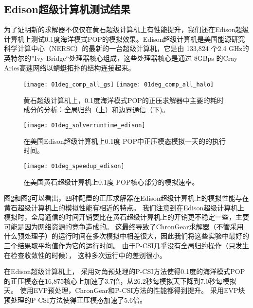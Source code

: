  

\subsection{Edison超级计算机测试结果}
\label{precond:exp:Edison}

 
为了证明新的求解器不仅仅在黄石超级计算机上有性能提升，我们还在Edison超级计算机上测试0.1度海洋模式POP的模拟效果。Edison超级计算机是美国能源研究科学计算中心（NERSC）的最新的一台超级计算机，它是由 133,824 个2.4 GHz的英特尔的”Ivy Bridge“处理器核心组成，这些处理器核心是通过 8GBps 的Cray
Aries高速网络以蜻蜓拓扑的结构连接起来。  
\begin {figure} 
\begin{center}
\texttt{[image: 01deg\_comp\_all\_gs]}
\hspace{10pt}
\texttt{[image: 01deg\_comp\_all\_halo]}
\end{center}
\caption[] {黄石超级计算机上，0.1度海洋模式POP的正压求解器中主要的耗时成分的分析：全局归约（上）和边界通信（下)。}
\label{fig:component}
\end {figure}
\begin {figure}
\centering
\texttt{[image: 01deg\_solverruntime\_edison]}
\caption []{在美国Edison超级计算机上0.1度 POP中正压模态模拟一天的的执行时间。\label {fig:runtime01_edison_time}}
\end {figure}

\begin {figure}
\centering
\texttt{[image: 01deg\_speedup\_edison]}
\caption []{在美国黄石超级计算机上0.1度 POP核心部分的模拟速率。\label {fig:runtime01_edison_rate}}
\end {figure}

图\ref{fig:runtime01_edison_time}和图\ref{fig:runtime01_edison_rate}可以看出，四种配置的正压求解器在Edison超级计算机上的模拟性能与在黄石超级计算机上的模拟性能有相近的特点。 
我们注意到在Edison超级计算机上模拟时，全局通信的时间开销要比在黄石超级计算机上的开销更不稳定一些，主要可能是因为网络资源的竞争造成的\cite{wang2014}。 
这最终导致了ChronGear求解器（不管采用什么预处理子）的运行时间在多次模拟中相差很大，因此我们将这些实验中最好的三个结果取平均值作为它的运行时间。 
由于P-CSI几乎没有全局归约操作（只发生在检查收敛性的时候）， 这种多次运行中的差别很小。 

 
在Edison超级计算机上， 采用对角预处理的P-CSI方法使得0.1度的海洋模式POP的正压模态在16,875核心上加速了3.7倍，从26.2秒每模拟天下降到7.0秒每模拟天。 
使用EVP预处理，ChronGear和P-CSI方法的性能都得到提升。 
采用EVP块预处理的P-CSI方法使得正压模态加速了5.6倍。 
 

